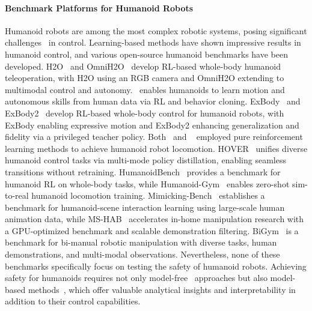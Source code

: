 \paragraph{Benchmark Platforms for Humanoid Robots}  
Humanoid robots are among the most complex robotic systems, posing significant challenges~\cite{gu2025humanoid} in control. Learning-based methods have shown impressive results in humanoid control, and various open-source humanoid benchmarks have been developed. H2O~ \cite{he2024learning} and OmniH2O~\cite{he2024omnih2o} develop RL-based whole-body humanoid teleoperation, with H2O using an RGB camera and OmniH2O extending to multimodal control and autonomy.~\cite{fu2024humanplus} enables humanoids to learn motion and autonomous skills from human data via RL and behavior cloning. ExBody~\cite{cheng2024expressive} and ExBody2~\cite{ji2024exbody2} develop RL-based whole-body control for humanoid robots, with ExBody enabling expressive motion and ExBody2 enhancing generalization and fidelity via a privileged teacher policy. Both~\cite{zhuang2024humanoid} and ~\cite{zhang2024wococo} employed pure reinforcement learning methods to achieve humanoid robot locomotion. HOVER~\cite{he2024hover} unifies diverse humanoid control tasks via multi-mode policy distillation, enabling seamless transitions without retraining. HumanoidBench~\citep{sferrazza2024humanoidbench} provides a benchmark for humanoid RL on whole-body tasks, while Humanoid-Gym~\cite{gu2024humanoid} enables zero-shot sim-to-real humanoid locomotion training.  Mimicking-Bench~\cite{liu2024mimicking} establishes a benchmark for humanoid-scene interaction learning using large-scale human animation data, while MS-HAB~\cite{shukla2024maniskill} accelerates in-home manipulation research with a GPU-optimized benchmark and scalable demonstration filtering. BiGym~\cite{chernyadev2024bigym} is a benchmark for bi-manual robotic manipulation with diverse tasks, human demonstrations, and multi-modal observations.
Nevertheless, none of these benchmarks specifically focus on testing the safety of humanoid robots. Achieving safety for humanoids requires not only model-free~\cite{zhao2021model,yang2023model} approaches but also model-based methods~\cite{berkenkamp2017safe,yun2024safe}, which offer valuable analytical insights and interpretability in addition to their control capabilities.  
